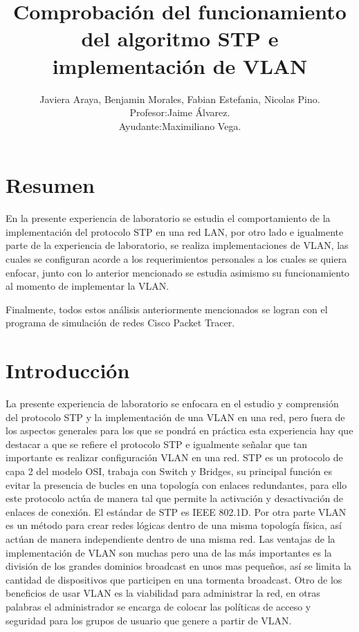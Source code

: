 \documentclass[spanish]{udpreport}
\title{Comprobación del funcionamiento del algoritmo STP e implementación de VLAN}
\author{Javiera Araya,
       Benjamin Morales,
        Fabian Estefania,
        Nicolas Pino.\\
        Profesor:Jaime Álvarez.\\
        Ayudante:Maximiliano Vega.}
\begin{document}
\maketitle




\chapter*{Resumen} 




En la presente experiencia de laboratorio se estudia el comportamiento de la implementación del protocolo STP en una red LAN, por otro lado e igualmente parte de la experiencia de laboratorio, se realiza implementaciones de VLAN, las cuales se configuran acorde a los requerimientos personales a los cuales se quiera enfocar, junto con lo anterior mencionado se estudia asimismo su funcionamiento al momento de implementar la VLAN.

Finalmente, todos estos análisis anteriormente mencionados se logran con el programa de simulación de redes Cisco Packet Tracer.

\tableofcontents

\chapter{Introducción}
La presente experiencia de laboratorio se enfocara en el estudio y comprensión del protocolo STP y la implementación de una VLAN en una red, pero fuera de los aspectos generales para los que se pondrá en práctica esta experiencia hay que destacar a que se refiere el protocolo STP e igualmente señalar que tan importante es realizar configuración VLAN en una red.
\vspace{0.5cm}
STP es un protocolo de capa 2 del modelo OSI, trabaja con Switch y Bridges, su principal función es evitar la presencia de bucles en una topología con enlaces redundantes, para ello este protocolo actúa de manera tal que permite la activación y desactivación de enlaces de conexión. El estándar de STP es IEEE 802.1D.
\vspace{0.5cm}
Por otra parte VLAN es un método para crear redes lógicas dentro de una misma topología física, así actúan de manera independiente dentro de una misma red. Las ventajas de la implementación de VLAN son muchas pero una de las más importantes es la división de los grandes dominios broadcast en unos mas pequeños, así se limita la cantidad de dispositivos que participen en una tormenta broadcast. Otro de los beneficios de usar VLAN es la viabilidad para administrar la red, en otras palabras el administrador se encarga de colocar las políticas de acceso y seguridad para los grupos de usuario que genere a partir de VLAN.
\end{document}
